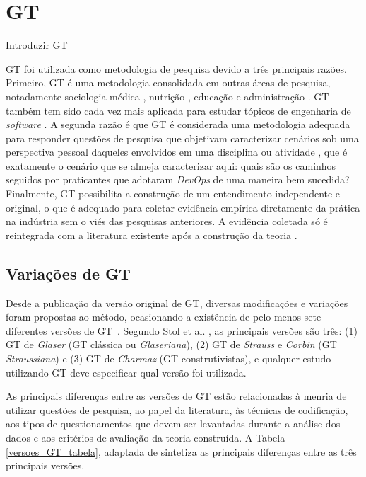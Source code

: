 \section{\acrfull{GT}}

Introduzir GT

\acrshort{GT} foi utilizada como metodologia de pesquisa devido a três principais
razões. Primeiro, \acrshort{GT} é uma metodologia consolidada em outras áreas de
pesquisa, notadamente sociologia médica \cite{gt_medical_sociology}, nutrição
\cite{gt_nursing}, educação \cite{gt_education} e administração
\cite{gt_management}. \acrshort{GT} também tem sido cada vez mais aplicada
para estudar tópicos de engenharia de \textit{software}
\cite{hoda2017becoming,Waterman:2015:ICSE,stol2016grounded}. A segunda
razão é que \acrshort{GT} é considerada uma metodologia adequada para responder
questões de pesquisa que objetivam caracterizar cenários sob uma perspectiva
pessoal daqueles envolvidos em uma disciplina ou atividade \cite{stol2016grounded},
que é exatamente o cenário que se almeja caracterizar aqui: quais são os caminhos
seguidos por praticantes que adotaram \textit{DevOps} de uma maneira bem
sucedida? Finalmente, \acrshort{GT} possibilita a construção de um entendimento
independente e original, o que é adequado para coletar evidência empírica
diretamente da prática na indústria sem o viés das pesquisas anteriores.
A evidência coletada só é reintegrada com a literatura existente após a construção
da teoria \cite{}.

\subsection{Variações de \acrshort{GT}}

Desde a publicação da versão original de \acrshort{GT}, diversas modificações
e variações foram propostas ao método, ocasionando a existência de pelo menos
sete diferentes versões de \acrfull{GT}~\cite{denzin2007grounded}. Segundo
Stol et al. \cite{stol2016grounded}, as principais versões são três: (1)
\acrshort{GT} de \textit{Glaser} (GT clássica ou \textit{Glaseriana}), (2)
\acrshort{GT} de \textit{Strauss} e \textit{Corbin} (GT \textit{Straussiana}) e
(3) \acrshort{GT} de \textit{Charmaz} (GT construtivistas), e qualquer
estudo utilizando \acrshort{GT} deve especificar qual versão foi utilizada.

As principais diferenças entre as versões de \acrshort{GT} estão relacionadas
à menria de utilizar questões de pesquisa, ao papel da literatura, às técnicas
de codificação, aos tipos de questionamentos que devem ser levantadas durante
a análise dos dados e aos critérios de avaliação da teoria construída. A
Tabela \ref{versoes_GT_tabela}, adaptada de \cite{stol2016grounded}
sintetiza as principais diferenças entre as três principais versões.


